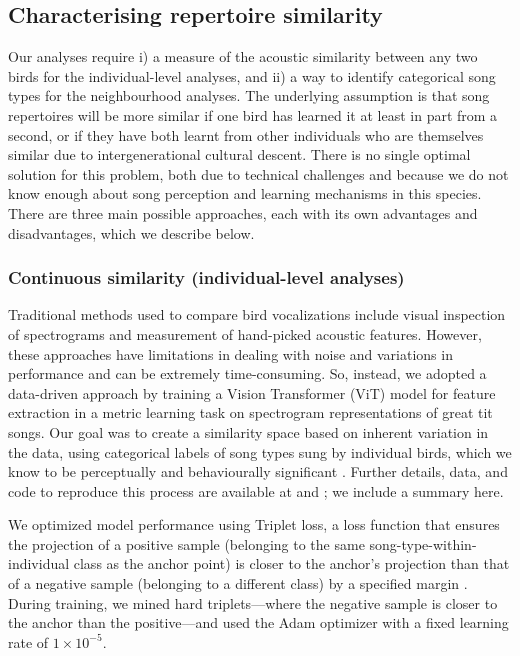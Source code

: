 \subsection{Characterising repertoire similarity}

Our analyses require i) a measure of the acoustic similarity between any two birds for the individual-level analyses, and ii) a way to identify categorical song types for the neighbourhood analyses. The underlying assumption is that song repertoires will be more similar if one bird has learned it at least in part from a second, or if they have both learnt from other individuals who are themselves similar due to intergenerational cultural descent. There is no single optimal solution for this problem, both due to technical challenges and because we do not know enough about song perception and learning mechanisms in this species. There are three main possible approaches, each with its own advantages and disadvantages, which we describe below.

\subsubsection{Continuous similarity (individual-level analyses)}
\label{sc:song-similarity}

Traditional methods used to compare bird vocalizations include visual inspection of spectrograms and measurement of hand-picked acoustic features. However, these approaches have limitations in dealing with noise and variations in performance and can be extremely time-consuming. So, instead, we adopted a data-driven approach by training a Vision Transformer (ViT) model for feature extraction in a metric learning task on spectrogram representations of great tit songs. Our goal was to create a similarity space based on inherent variation in the data, using categorical labels of song types sung by individual birds, which we know to be perceptually and behaviourally significant \autocite{lind1996}. Further details, data, and code to reproduce this process are available at \autocite{merinorecalde2023} and \autocite{merinorecalde2023a}; we include a summary here.

We optimized model performance using Triplet loss, a loss function that ensures the projection of a positive sample (belonging to the same song-type-within-individual class as the anchor point) is closer to the anchor's projection than that of a negative sample (belonging to a different class) by a specified margin \autocite{hermans2017, hoffer2018}. During training, we mined hard triplets---where the negative sample is closer to the anchor than the positive---and used the Adam optimizer with a fixed learning rate of $1 \times 10^{-5}$.


